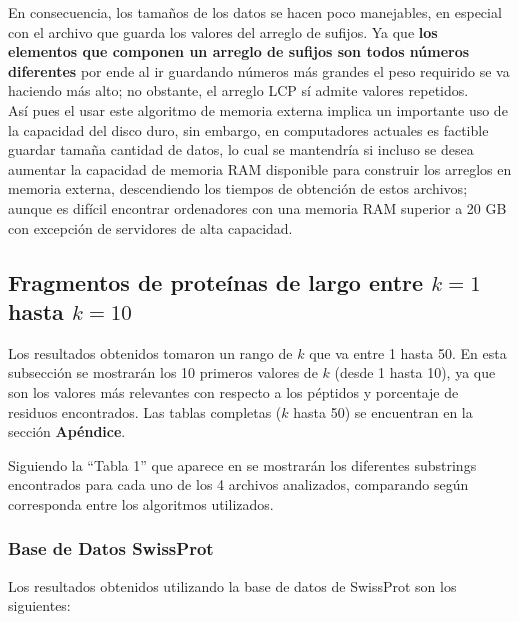 En consecuencia, los tamaños de los datos se hacen poco manejables, en especial con el archivo que guarda los valores del arreglo de sufijos. Ya que \textbf{los elementos que componen un arreglo de sufijos son todos números diferentes} por ende al ir guardando números más grandes el peso requirido se va haciendo más alto; no obstante, el arreglo LCP sí admite valores repetidos.\\
Así pues el usar este algoritmo de memoria externa implica un importante uso de la capacidad del disco duro, sin embargo, en computadores actuales es factible guardar tamaña cantidad de datos, lo cual se mantendría si incluso se desea aumentar la capacidad de memoria RAM disponible para construir los arreglos en memoria externa, descendiendo los tiempos de obtención de estos archivos; aunque es difícil encontrar ordenadores con una memoria RAM superior a 20 GB con excepción de servidores de alta capacidad. 

\subsection{Fragmentos de proteínas de largo entre $k = 1$ hasta $k = 10$}

Los resultados obtenidos tomaron un rango de $k$ que va entre 1 hasta 50. En esta subsección se mostrarán los 10 primeros valores de $k$ (desde 1 hasta 10), ya que son los valores más relevantes con respecto a los péptidos y porcentaje de residuos encontrados. Las tablas completas ($k$ hasta 50) se encuentran en la sección \textbf{Apéndice}.

Siguiendo la ``Tabla 1'' que aparece en \cite{searching} se mostrarán los diferentes substrings encontrados para cada uno de los 4 archivos analizados, comparando según corresponda entre los algoritmos utilizados.

\subsubsection{Base de Datos SwissProt}

Los resultados obtenidos utilizando la base de datos de SwissProt son los siguientes:

